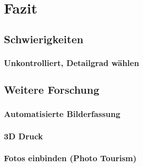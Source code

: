 \chapter{Fazit}
	\section{Schwierigkeiten}
		\subsection{Unkontrolliert, Detailgrad wählen}
		
	\section{Weitere Forschung}
		\subsection{Automatisierte Bilderfassung}
		\subsection{3D Druck}
		\subsection{Fotos einbinden (Photo Tourism)}
	